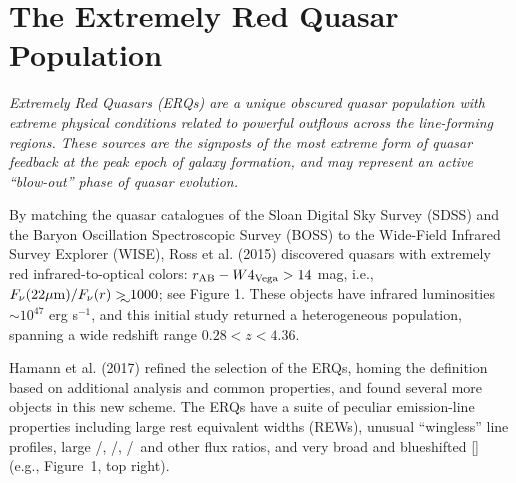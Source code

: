 \section*{The Extremely Red Quasar Population} 
{\it Extremely Red Quasars (ERQs) are a unique obscured quasar
population with extreme physical conditions related to powerful
outflows across the line-forming regions. These sources are the
signposts of the most extreme form of quasar feedback at the peak
epoch of galaxy formation, and may represent an active ``blow-out''
phase of quasar evolution.}

\smallskip
\smallskip
\noindent
By matching the quasar catalogues of the Sloan Digital Sky Survey
(SDSS) and the Baryon Oscillation Spectroscopic Survey (BOSS) to the
Wide-Field Infrared Survey Explorer (WISE), Ross et al. (2015)
discovered quasars with extremely red infrared-to-optical colors:
$r_{\rm AB}-W4_{\rm Vega}>14$ mag, i.e., $F_\nu({\rm 22\mu
m})/F_\nu(r) \gtrsim 1000$; see Figure 1. These objects have infrared
luminosities $\sim 10^{47}$ erg s$^{-1}$, and this initial study
returned a heterogeneous population, spanning a wide redshift
range $0.28 < z < 4.36$.

\smallskip
\smallskip
\noindent
Hamann et al. (2017) refined the selection of the ERQs, homing the
definition based on additional analysis and common properties, and 
found several more objects in this new scheme. The ERQs have a
suite of peculiar emission-line properties including large rest
equivalent widths (REWs), unusual ``wingless'' line profiles, large
\nv /\lya , \nv /\civ , \siiv /\civ\ and other flux ratios, and very
broad and blueshifted [\oiii ]  (e.g., Figure~1, top right).

